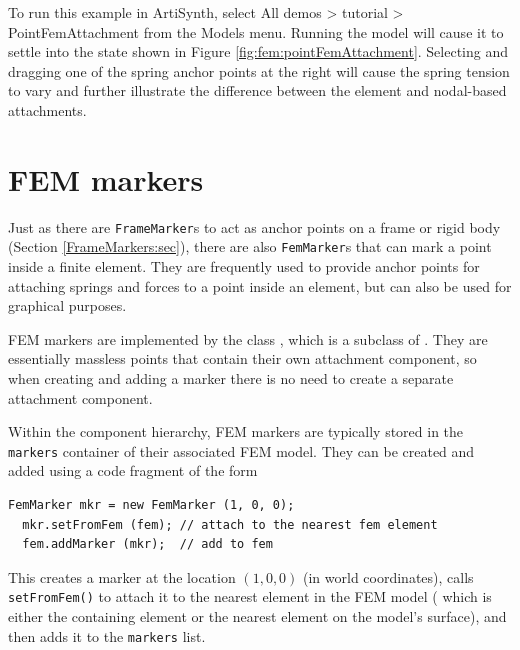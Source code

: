 To run this example in ArtiSynth, select {\sf All demos > tutorial >
PointFemAttachment} from the {\sf Models} menu. Running the model will
cause it to settle into the state shown in Figure
\ref{fig:fem:pointFemAttachment}. Selecting and dragging one of the
spring anchor points at the right will cause the spring tension to
vary and further illustrate the difference between the element
and nodal-based attachments.

\section{FEM markers}

Just as there are {\tt FrameMarker}s to act as anchor points on a frame or
rigid body (Section \ref{FrameMarkers:sec}), there are also {\tt FemMarker}s 
that can mark a point inside a finite element.  They are frequently used to 
provide anchor points for attaching springs and forces to a point inside 
an element, but can also be used for graphical purposes.

FEM markers are implemented by the class
, which
is a subclass of
.
They are essentially massless points that contain their own attachment
component, so when creating and adding a marker there is no need to
create a separate attachment component.

Within the component hierarchy, FEM markers are typically stored in
the {\tt markers} container of their associated FEM model. They can
be created and added using a code fragment of the form
%
\begin{lstlisting}[]
  FemMarker mkr = new FemMarker (1, 0, 0);
  mkr.setFromFem (fem); // attach to the nearest fem element
  fem.addMarker (mkr);  // add to fem
\end{lstlisting}
%
This creates a marker at the location $(1,0,0)$ (in world
coordinates), calls {\tt setFromFem()} to attach it to the nearest
element in the FEM model ( which is either the containing element or
the nearest element on the model's surface), and then adds it to the
{\tt markers} list.

